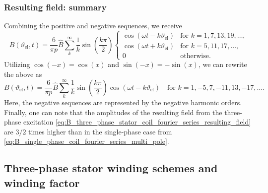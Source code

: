 \begin{frame}
	\frametitle{Resulting field: summary}
	Combining the positive and negative sequences, we receive
	\begin{equation}
		B(\vartheta_\mathrm{el}, t) = \frac{6}{\pi p} \hat{B} \sum_{k}^{\infty} \frac{1}{k} \sin\left(\frac{k \pi}{2}\right) \begin{cases}
			\cos(\omega t - k \vartheta_\mathrm{el}) & \text{for } k=1,7,13,19,\ldots, \\
			\cos(\omega t + k \vartheta_\mathrm{el}) & \text{for } k=5,11,17,\ldots,   \\
			0                                        & \text{otherwise}.
		\end{cases}
	\end{equation}
	\pause
	Utilizing $\cos(-x)=\cos(x)$ and $\sin(-x)=-\sin(x)$, we can rewrite the above as
	\begin{equation}
		B(\vartheta_\mathrm{el}, t) = \frac{6}{\pi p} \hat{B} \sum_{k}^{\infty} \frac{1}{k} \sin\left(\frac{k \pi}{2}\right) \cos(\omega t - k \vartheta_\mathrm{el}) \quad \mbox{for } k=1,-5,7,-11,13,-17,\ldots.
		\label{eq:B_three_phase_stator_coil_fourier_series_resulting_field}
	\end{equation}
	\pause
	Here, the negative sequences are represented by the negative harmonic orders. Finally, one can note that the amplitudes of the resulting field from the three-phase excitation \eqref{eq:B_three_phase_stator_coil_fourier_series_resulting_field} are $3/2$ times higher than in the single-phase case from \eqref{eq:B_single_phase_coil_fourier_series_multi_pole}.
\end{frame}

\subsection{Three-phase stator winding schemes and winding factor}

